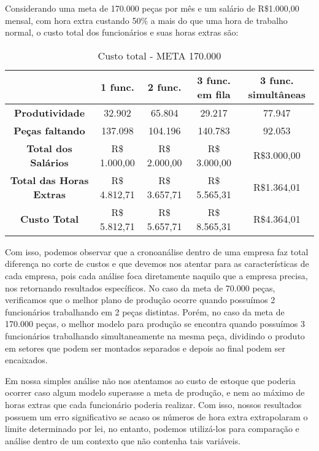 \documentclass[
	12pt,				%
	oneside,			%
	a4paper,			%
	english,			%
	french,				%
	spanish,			%
	brazil,				%
	]{abntex2}
\begin{document}
Considerando uma meta de 170.000 peças por mês e um salário de R$\$$1.000,00 mensal, com hora extra custando 50$\%$ a mais do que uma hora de trabalho normal, o custo total dos funcionários e suas horas extras são:

\begin{table}[H]
\centering
\caption{Custo total - META 170.000}
\vspace{0.5cm}
\begin{tabular}{c|c|c|c|c}

			 & \textbf{1 func.} & \textbf{2 func.} & \textbf{3 func. em fila} & \textbf{3 func. simultâneas} \\ \hline
\textbf{Produtividade} & 32.902 & 65.804 & 29.217 & 77.947 \\ \hline
\textbf{Peças faltando} & 137.098 & 104.196 & 140.783 & 92.053 \\ \hline
\textbf{Total dos Salários} & R$\$$1.000,00 & R$\$$2.000,00 & R$\$$3.000,00 & R$\$$3.000,00 \\ \hline
\textbf{Total das Horas Extras} & R$\$$4.812,71 & R$\$$3.657,71 & R$\$$5.565,31 & R$\$$1.364,01 \\ \hline
\textbf{Custo Total} & R$\$$5.812,71 & R$\$$5.657,71 & R$\$$8.565,31 & R$\$$4.364,01 

\end{tabular}
\label{t4}
\end{table}

Com isso, podemos observar que a cronoanálise dentro de uma empresa faz total diferença no corte de custos e que devemos nos atentar para as características de cada empresa, pois cada análise foca diretamente naquilo que a empresa precisa, nos retornando resultados específicos. No caso da meta de 70.000 peças, verificamos que o melhor plano de produção ocorre quando possuímos 2 funcionários trabalhando em 2 peças distintas. Porém, no caso da meta de 170.000 peças, o melhor modelo para produção se encontra quando possuímos 3 funcionários trabalhando simultaneamente na mesma peça, dividindo o produto em setores que podem ser montados separados e depois ao final podem ser encaixados.

Em nossa simples análise não nos atentamos ao custo de estoque que poderia ocorrer caso algum modelo superasse a meta de produção, e nem ao máximo de horas extras que cada funcionário poderia realizar. Com isso, nossos resultados possuem um erro significativo se acaso os números de hora extra extrapolaram o limite determinado por lei, no entanto, podemos utilizá-los para comparação e análise dentro de um contexto que não contenha tais variáveis.
\end{document}
